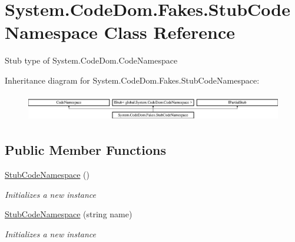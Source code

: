 \hypertarget{class_system_1_1_code_dom_1_1_fakes_1_1_stub_code_namespace}{\section{System.\-Code\-Dom.\-Fakes.\-Stub\-Code\-Namespace Class Reference}
\label{class_system_1_1_code_dom_1_1_fakes_1_1_stub_code_namespace}
}


Stub type of System.\-Code\-Dom.\-Code\-Namespace 


Inheritance diagram for System.\-Code\-Dom.\-Fakes.\-Stub\-Code\-Namespace\-:\begin{figure}[H]
\begin{center}
\leavevmode
\includegraphics[height=1.208199cm]{class_system_1_1_code_dom_1_1_fakes_1_1_stub_code_namespace}
\end{center}
\end{figure}
\subsection*{Public Member Functions}
\begin{DoxyCompactItemize}
\item 
\hyperlink{class_system_1_1_code_dom_1_1_fakes_1_1_stub_code_namespace_a78747c2cee88dc1e0c7fe71eebfb5c76}{Stub\-Code\-Namespace} ()
\begin{DoxyCompactList}\small\item\em Initializes a new instance\end{DoxyCompactList}\item 
\hyperlink{class_system_1_1_code_dom_1_1_fakes_1_1_stub_code_namespace_a8b29b29b00ddf70f11285ab21b536c99}{Stub\-Code\-Namespace} (string name)
\begin{DoxyCompactList}\small\item\em Initializes a new instance\end{DoxyCompactList}\end{DoxyCompactItemize}
